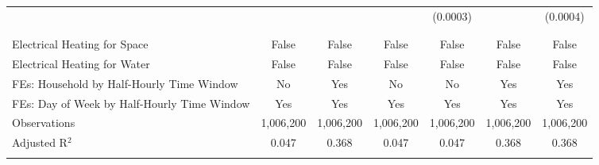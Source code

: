 \begin{table}[!htbp]
\begin{tabular}{@{\extracolsep{20pt}}lcccccc}
  &  &  &  & (0.0003) &  & (0.0004) \\ 
  & & & & & & \\ 
\hline \\[-1.8ex] 
Electrical Heating for Space & False & False & False & False & False & False \\ 
Electrical Heating for Water & False & False & False & False & False & False \\ 
FEs: Household by Half-Hourly Time Window & No & Yes & No & No & Yes & Yes \\ 
FEs: Day of Week by Half-Hourly Time Window & Yes & Yes & Yes & Yes & Yes & Yes \\ 
Observations & 1,006,200 & 1,006,200 & 1,006,200 & 1,006,200 & 1,006,200 & 1,006,200 \\ 
Adjusted R$^{2}$ & 0.047 & 0.368 & 0.047 & 0.047 & 0.368 & 0.368 \\ 
\hline 
\hline \\[-1.8ex] 
\end{tabular} 
\end{table} 
